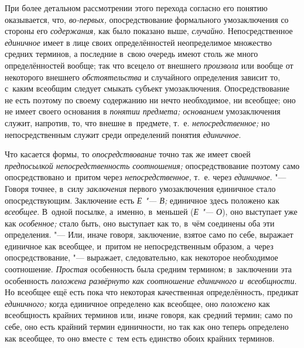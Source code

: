 При более детальном рассмотрении этого перехода согласно его
понятию оказывается, что, {\em во-первых,}
опосредствование формального умозаключения со стороны его
{\em содержания,} как было показано выше, {\em случайно}.
Непосредственное {\em единичное} имеет в
лице своих определённостей неопределимое множество средних терминов, а
последние в~свою очередь имеют столь же много определённостей вообще; так
что всецело от внешнего {\em произвола}
или вообще от некоторого внешнего {\em обстоятельства} и
случайного определения зависит то, с~каким всеобщим следует смыкать субъект
умозаключения. Опосредствование не есть поэтому по своему содержанию ни
нечто необходимое, ни всеобщее; оно не имеет своего основания в
{\em понятии предмета; основанием}
умозаключения служит, напротив, то, что внешне в~предмете,
т.~е. {\em непосредственное;}
но непосредственным служит среди определений понятия {\em единичное}.

Что касается формы, то {\em опосредствование} точно так же имеет своей
{\em предпосылкой непосредственность
соотношения;} опосредствование поэтому само опосредствовано
и~притом через {\em непосредственное,} т.~е. через {\em единичное}. "--- Говоря
точнее, в~силу {\em заключения}
первого умозаключения единичное стало опосредствующим.
Заключение есть {\em Е "--- В;} единичное здесь положено как
{\em всеобщее}. В~одной посылке, а~именно, в~меньшей ({\em Е "--- О}),
оно выступает уже как {\em особенное;} стало
быть, оно выступает как то, в~чём соединены оба эти определения. "---
Или, иначе говоря, заключение, взятое само по себе, выражает
единичное как всеобщее, и~притом не непосредственным образом, а~через
опосредствование, "--- выражает, следовательно, как некоторое
необходимое соотношение. {\em Простая}
особенность была средним термином; в~заключении эта
особенность {\em положена развёрнуто как
соотношение единичного и~всеобщности}. Но всеобщее ещё есть
пока что некоторая качественная определённость, предикат
{\em единичного;} когда единичное определено как всеобщее, оно
{\em положено} как
всеобщность крайних терминов или, иначе говоря, как средний термин; само по
себе, оно есть крайний термин единичности, но так как оно теперь определено
как всеобщее, то оно вместе с~тем есть единство обоих крайних терминов.


